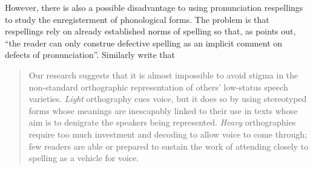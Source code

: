 However, there is also a possible disadvantage to using pronunciation respellings to study the enregisterment of phonological forms. The problem is that respellings rely on already established norms of spelling so that, as \citet[197]{Agha2007} points out, “the reader can only construe defective spelling as an implicit comment on defects of pronunciation”. Similarly \citet[582]{Jaffe2000} write that

\begin{quote}
Our research suggests that it is almost impossible to avoid stigma in the non-standard orthographic representation of others’ low-status speech varieties. \emph{Light} orthography cues voice, but it does so by using stereotyped forms whose meanings are inescapably linked to their use in texts whose aim is to denigrate the speakers being represented. \emph{Heavy} orthographies require too much investment and decoding to allow voice to come through; few readers are able or prepared to sustain the work of attending closely to spelling as a vehicle for voice.
\end{quote}

